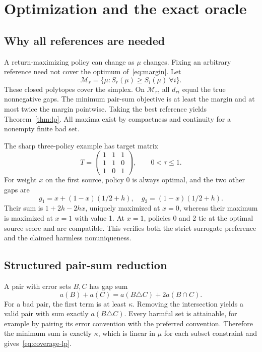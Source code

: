 \documentclass[11pt]{article}
\theoremstyle{definition}\newtheorem{definition}[theorem]{Definition}
\newcommand{\1}{\mathbf{1}}
\begin{document}
\section{Optimization and the exact oracle}\label{app:oracle}
\subsection{Why all references are needed}
A return-maximizing policy can change as $\mu$ changes. Fixing an arbitrary reference need not cover the optimum of~\eqref{eq:margin}. Let
\begin{equation*}
 \mathcal M_r=\{\mu:S_r(\mu)\geq S_i(\mu)\ \forall i\}.
\end{equation*}
These closed polytopes cover the simplex. On $\mathcal M_r$, all $d_{ri}$ equal the true nonnegative gaps. The minimum pair-sum objective is at least the margin and at most twice the margin pointwise. Taking the best reference yields Theorem~\ref{thm:lp}. All maxima exist by compactness and continuity for a nonempty finite bad set.

The sharp three-policy example has target matrix
\begin{equation*}
 T=\begin{pmatrix}1&1&1\\1&1&0\\1&0&1\end{pmatrix},\qquad 0<\tau\leq1.
\end{equation*}
For weight $x$ on the first source, policy 0 is always optimal, and the two other gaps are
\begin{equation*}
 g_1=x+(1-x)(1/2+h),\quad g_2=(1-x)(1/2+h).
\end{equation*}
Their sum is $1+2h-2hx$, uniquely maximized at $x=0$, whereas their maximum is maximized at $x=1$ with value 1. At $x=1$, policies 0 and 2 tie at the optimal source score and are compatible. This verifies both the strict surrogate preference and the claimed harmless nonuniqueness.

\subsection{Structured pair-sum reduction}
A pair with error sets $B,C$ has gap sum
\begin{equation*}
 a(B)+a(C)=a(B\triangle C)+2a(B\cap C).
\end{equation*}
For a bad pair, the first term is at least $\kappa$. Removing the intersection yields a valid pair with sum exactly $a(B\triangle C)$. Every harmful set is attainable, for example by pairing its error convention with the preferred convention. Therefore the minimum sum is exactly $\kappa$, which is linear in $\mu$ for each subset constraint and gives~\eqref{eq:coverage-lp}.
\end{document}
